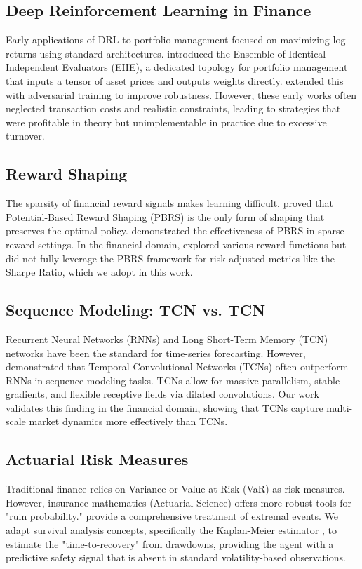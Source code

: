 \subsection{Deep Reinforcement Learning in Finance}
Early applications of DRL to portfolio management focused on maximizing log returns using standard architectures. \citet{jiang2017deep} introduced the Ensemble of Identical Independent Evaluators (EIIE), a dedicated topology for portfolio management that inputs a tensor of asset prices and outputs weights directly. \citet{liang2018adversarial} extended this with adversarial training to improve robustness. However, these early works often neglected transaction costs and realistic constraints, leading to strategies that were profitable in theory but unimplementable in practice due to excessive turnover.

\subsection{Reward Shaping}
The sparsity of financial reward signals makes learning difficult. \citet{ng1999policy} proved that Potential-Based Reward Shaping (PBRS) is the only form of shaping that preserves the optimal policy. \citet{devidze2022exploration} demonstrated the effectiveness of PBRS in sparse reward settings. In the financial domain, \citet{xu2021portfolio} explored various reward functions but did not fully leverage the PBRS framework for risk-adjusted metrics like the Sharpe Ratio, which we adopt in this work.

\subsection{Sequence Modeling: TCN vs. TCN}
Recurrent Neural Networks (RNNs) and Long Short-Term Memory (TCN) networks have been the standard for time-series forecasting. However, \citet{bai2018tcn} demonstrated that Temporal Convolutional Networks (TCNs) often outperform RNNs in sequence modeling tasks. TCNs allow for massive parallelism, stable gradients, and flexible receptive fields via dilated convolutions. Our work validates this finding in the financial domain, showing that TCNs capture multi-scale market dynamics more effectively than TCNs.

\subsection{Actuarial Risk Measures}
Traditional finance relies on Variance or Value-at-Risk (VaR) as risk measures. However, insurance mathematics (Actuarial Science) offers more robust tools for "ruin probability." \citet{embrechts2013modelling} provide a comprehensive treatment of extremal events. We adapt survival analysis concepts, specifically the Kaplan-Meier estimator \citep{kaplan1958nonparametric}, to estimate the "time-to-recovery" from drawdowns, providing the agent with a predictive safety signal that is absent in standard volatility-based observations.
